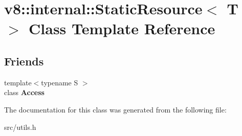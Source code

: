\hypertarget{classv8_1_1internal_1_1_static_resource}{}\section{v8\+:\+:internal\+:\+:Static\+Resource$<$ T $>$ Class Template Reference}
\label{classv8_1_1internal_1_1_static_resource}
\subsection*{Friends}
\begin{DoxyCompactItemize}
\item 
\hypertarget{classv8_1_1internal_1_1_static_resource_a82b51203b782e017f007b283bb1515db}{}{\footnotesize template$<$typename S $>$ }\\class {\bfseries Access}\label{classv8_1_1internal_1_1_static_resource_a82b51203b782e017f007b283bb1515db}

\end{DoxyCompactItemize}


The documentation for this class was generated from the following file\+:\begin{DoxyCompactItemize}
\item 
src/utils.\+h\end{DoxyCompactItemize}
